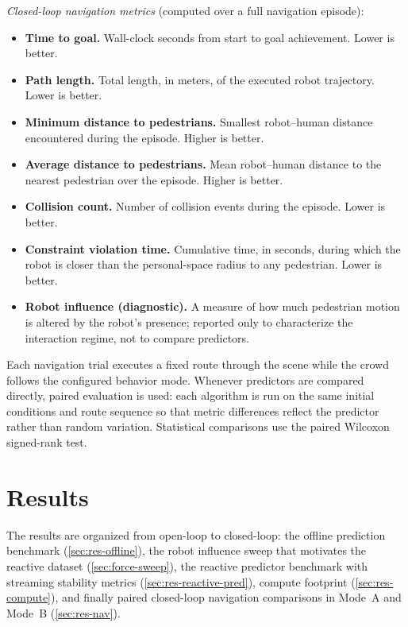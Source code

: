 \documentclass[12pt, a4paper]{article}
\begin{document}
\emph{Closed-loop navigation metrics} (computed over a full navigation episode):
\begin{itemize}[leftmargin=2em,itemsep=2pt,topsep=2pt]
\item \textbf{Time to goal.} Wall-clock seconds from start to goal achievement. Lower is better.
\item \textbf{Path length.} Total length, in meters, of the executed robot trajectory. Lower is better.
\item \textbf{Minimum distance to pedestrians.} Smallest robot--human distance encountered during the episode. Higher is better.
\item \textbf{Average distance to pedestrians.} Mean robot--human distance to the nearest pedestrian over the episode. Higher is better.
\item \textbf{Collision count.} Number of collision events during the episode. Lower is better.
\item \textbf{Constraint violation time.} Cumulative time, in seconds, during which the robot is closer than the personal-space radius to any pedestrian. Lower is better.
\item \textbf{Robot influence (diagnostic).} A measure of how much pedestrian motion is altered by the robot's presence; reported only to characterize the interaction regime, not to compare predictors.
\end{itemize}

Each navigation trial executes a fixed route through the scene while the crowd follows the configured behavior mode. Whenever predictors are compared directly, paired evaluation is used: each algorithm is run on the same initial conditions and route sequence so that metric differences reflect the predictor rather than random variation. Statistical comparisons use the paired Wilcoxon signed-rank test.

\section{Results}
\label{sec:results}

The results are organized from open-loop to closed-loop: the offline prediction benchmark (\ref{sec:res-offline}), the robot influence sweep that motivates the reactive dataset (\ref{sec:force-sweep}), the reactive predictor benchmark with streaming stability metrics (\ref{sec:res-reactive-pred}), compute footprint (\ref{sec:res-compute}), and finally paired closed-loop navigation comparisons in Mode~A and Mode~B (\ref{sec:res-nav}).
\end{document}

